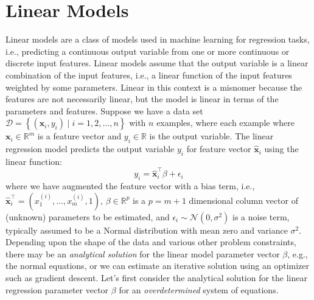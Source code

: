 \documentclass{article}[11pt]
\def\R{\mathbb{R}}
\begin{document}
\section{Linear Models}
Linear models are a class of models used in machine learning for regression tasks, i.e., predicting a continuous output variable from one or more continuous or discrete input features.
Linear models assume that the output variable is a linear combination of the input features, i.e., a linear function of the input features weighted by some parameters.
Linear in this context is a misnomer because the features are not necessarily linear, but the model is linear in terms of the parameters and features.
Suppose we have a data set $\mathcal{D} = \left\{(\mathbf{x}_{i},y_{i}) \mid i=1,2,\dots,n\right\}$ with $n$ examples, where each example where $\mathbf{x}_{i}\in\R^{m}$ is a feature vector and $y_{i}\in\R$ is the output variable.
The linear regression model predicts the output variable $y_{i}$ for feature vector $\hat{\mathbf{x}}_{i}$ using the linear function:
\begin{equation*}
    y_{i} = \hat{\mathbf{x}}_{i}^{\top}\beta + \epsilon_{i}
\end{equation*}
where we have augmented the feature vector with a bias term, i.e., $\hat{\mathbf{x}}_{i}^{\top} = \left(x^{(i)}_{1},\dots,x^{(i)}_{m},1\right)$, $\beta\in\mathbb{R}^{p}$ is a $p=m+1$ dimensional column vector of (unknown) parameters to be estimated, and $\epsilon_{i}\sim\mathcal{N}(0,\sigma^{2})$ is a noise term, typically assumed to be a Normal distribution with mean zero and variance $\sigma^{2}$.
Depending upon the shape of the data and various other problem constraints, 
there may be an \textit{analytical solution} for the linear model parameter vector $\beta$, e.g., the normal equations, or we can estimate an iterative solution using an optimizer such as gradient descent.
Let's first consider the analytical solution for the linear regression parameter vector $\beta$ for an \textit{overdetermined} system of equations.
\end{document}
